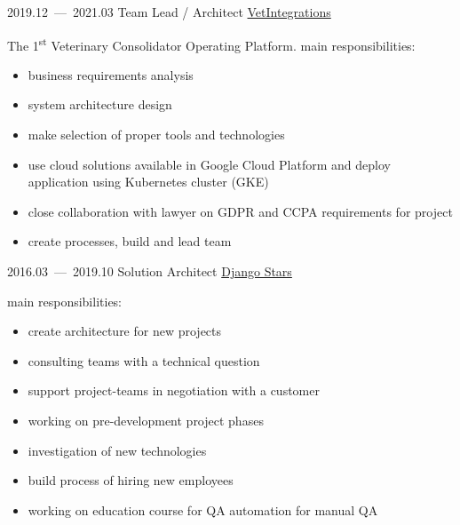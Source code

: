\documentclass[11pt,a4paper,oneside]{moderncv}
\begin{document}
        \cventry
            {2019.12~---~2021.03}
            {Team Lead / Architect}
            {\href{http://vetintegrations.com/}{VetIntegrations}}
            {}{}
            {
              The 1\textsuperscript{st} Veterinary Consolidator Operating Platform.\newline
              main responsibilities:
              \begin{itemize}
                \item business requirements analysis
                \item system architecture design
                \item make selection of proper tools and technologies
                \item use cloud solutions available in Google Cloud Platform and deploy application using Kubernetes cluster (GKE)
                \item close collaboration with lawyer on GDPR and CCPA requirements for project
                \item create processes, build and lead team
              \end{itemize}
            }

        \cventry
            {2016.03~---~2019.10}
            {Solution Architect}
            {\href{http://djangostars.com}{Django Stars}}
            {}{}
            {
              main responsibilities:
              \begin{itemize}
                \item create architecture for new projects
                \item consulting teams with a technical question
                \item support project-teams in negotiation with a customer
                \item working on pre-development project phases
                \item investigation of new technologies
                \item build process of hiring new employees
                \item working on education course for QA automation for manual QA
              \end{itemize}
            }
\end{document}
